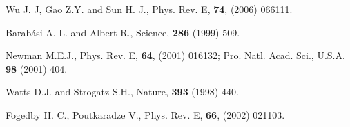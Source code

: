 \documentclass[doublecol]{epl2}
\begin{document}
\begin{thebibliography}{ref1}
Wu J. J, Gao Z.Y. and Sun H. J., Phys. Rev. E,
\textbf{74}, (2006) 066111.


Barab\'{a}si A.-L. and  Albert R., Science,
\textbf{286} (1999) 509.


 Newman M.E.J., Phys. Rev. E, \textbf{64}, (2001) 016132;
Pro. Natl. Acad. Sci., U.S.A. \textbf{98} (2001) 404.

Watts D.J. and Strogatz S.H., Nature,
\textbf{393} (1998) 440.

 Fogedby H. C., Poutkaradze V., Phys. Rev. E, \textbf{66},
(2002) 021103.

\end{thebibliography}
\end{document}
